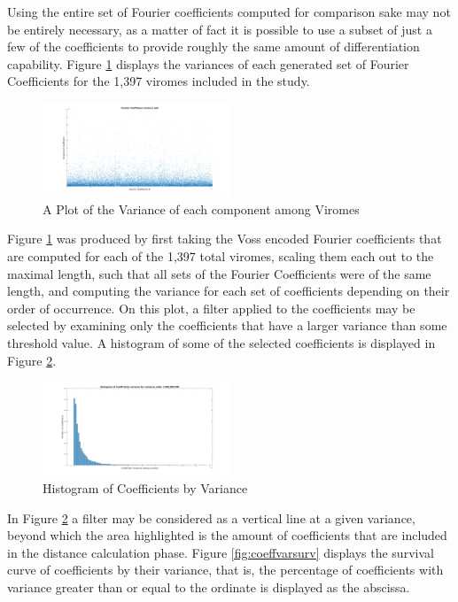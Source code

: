 Using the entire set of Fourier coefficients computed for comparison sake may not be entirely necessary, 
as a matter of fact it is possible to use a subset of just a few of the coefficients to provide roughly 
the same amount of differentiation capability. Figure \ref{fig:coeffvar} displays the variances of each 
generated set of Fourier Coefficients for the 1,397 viromes included in the study.  

\begin{figure}[h!] 
\includegraphics[width=0.5\textwidth]{Images/Files/FCoeff_var.png} 
\caption{A Plot of the Variance of each component among Viromes\label{fig:coeffvar}} 
\end{figure} 

Figure \ref{fig:coeffvar} was produced by first taking the Voss encoded Fourier coefficients that are 
computed for each of the 1,397 total viromes, scaling them each out to the maximal length, such that all 
sets of the Fourier Coefficients were of the same length, and computing the variance for each set of 
coefficients depending on their order of occurrence. On this plot, a filter applied to the coefficients may 
be selected by examining only the coefficients that have a larger variance than some threshold value. 
A histogram of some of the selected coefficients is displayed in Figure \ref{fig:coeffvarhist}. 

\begin{figure}[h!]
\includegraphics[width=0.5\textwidth]{Images/Files/FCoeff_var_hist.png}
\caption{Histogram of Coefficients by Variance\label{fig:coeffvarhist}}
\end{figure} 

In Figure \ref{fig:coeffvarhist} a filter may be considered as a vertical line at a given variance, beyond which the area
highlighted is the amount of coefficients that are included in the distance calculation phase.  Figure 
\ref{fig:coeffvarsurv} displays the survival curve of coefficients by their variance, that is, the
percentage of coefficients with variance greater than or equal to the ordinate is displayed as the 
abscissa. 

